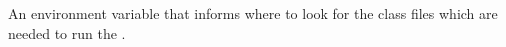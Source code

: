 \item[Classpath for \gdaut]{
\begin{sloppypar}
An environment variable that informs  where to look for the class files which are needed to run the \gdaut{}.

\end{sloppypar}
}